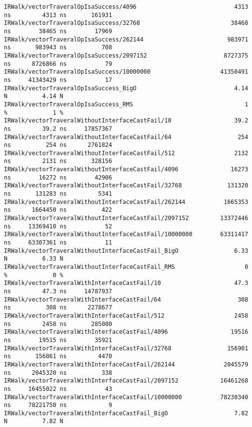 \begin{code}
\begin{verbatim}
IRWalk/vectorTraveralOpIsaSuccess/4096                            4313 ns         4313 ns       161931
IRWalk/vectorTraveralOpIsaSuccess/32768                          38468 ns        38465 ns        17969
IRWalk/vectorTraveralOpIsaSuccess/262144                        983971 ns       983943 ns          708
IRWalk/vectorTraveralOpIsaSuccess/2097152                      8727375 ns      8726866 ns           79
IRWalk/vectorTraveralOpIsaSuccess/10000000                    41350491 ns     41343429 ns           17
IRWalk/vectorTraveralOpIsaSuccess_BigO                            4.14 N          4.14 N
IRWalk/vectorTraveralOpIsaSuccess_RMS                                1 %             1 %
IRWalk/vectorTraveralWithoutInterfaceCastFail/10                  39.2 ns         39.2 ns     17857367
IRWalk/vectorTraveralWithoutInterfaceCastFail/64                   254 ns          254 ns      2761824
IRWalk/vectorTraveralWithoutInterfaceCastFail/512                 2132 ns         2131 ns       328156
IRWalk/vectorTraveralWithoutInterfaceCastFail/4096               16273 ns        16272 ns        42906
IRWalk/vectorTraveralWithoutInterfaceCastFail/32768             131320 ns       131283 ns         5341
IRWalk/vectorTraveralWithoutInterfaceCastFail/262144           1665353 ns      1664450 ns          422
IRWalk/vectorTraveralWithoutInterfaceCastFail/2097152         13372446 ns     13369410 ns           52
IRWalk/vectorTraveralWithoutInterfaceCastFail/10000000        63311417 ns     63307361 ns           11
IRWalk/vectorTraveralWithoutInterfaceCastFail_BigO                6.33 N          6.33 N
IRWalk/vectorTraveralWithoutInterfaceCastFail_RMS                    0 %             0 %
IRWalk/vectorTraveralWithInterfaceCastFail/10                     47.3 ns         47.3 ns     14787937
IRWalk/vectorTraveralWithInterfaceCastFail/64                      308 ns          308 ns      2278677
IRWalk/vectorTraveralWithInterfaceCastFail/512                    2458 ns         2458 ns       285080
IRWalk/vectorTraveralWithInterfaceCastFail/4096                  19516 ns        19515 ns        35921
IRWalk/vectorTraveralWithInterfaceCastFail/32768                156901 ns       156861 ns         4470
IRWalk/vectorTraveralWithInterfaceCastFail/262144              2045579 ns      2045320 ns          338
IRWalk/vectorTraveralWithInterfaceCastFail/2097152            16461268 ns     16455022 ns           43
IRWalk/vectorTraveralWithInterfaceCastFail/10000000           78230340 ns     78221750 ns            9
IRWalk/vectorTraveralWithInterfaceCastFail_BigO                   7.82 N          7.82 N

\end{verbatim}
\end{code}
